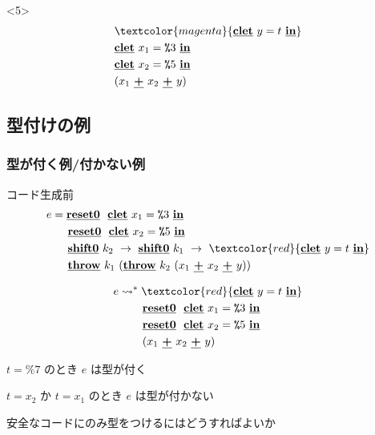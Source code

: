\documentclass[dvipdfmx,cjk,xcolor=dvipsnames,envcountsect,notheorems,12pt]{beamer}
\newcommand\cResetz{\underline{\textbf{reset0}}}
\newcommand\cShiftz{\underline{\textbf{shift0}}}
\newcommand\cThrow{\underline{\textbf{throw}}}
\newcommand\cPlus{\underline{\textbf{+}}}
\newcommand\cLet{\underline{\textbf{clet}}}
\newcommand\cIn{\underline{\textbf{in}}}
\newcommand\csp[1]{\texttt{\%}{#1}}
\newcommand\too{\leadsto^*}
\newcommand\red[1]{\textcolor{red}{#1}}
\newcommand\magenta[1]{\textcolor{magenta}{#1}}
\theoremstyle{definition}
\begin{document}
\begin{frame}
  \begin{onlyenv}<5>
    \begin{align*}
      & \magenta{\cLet~y=t~\cIn} \\
      & \cLet~x_1=\csp{3}~\cIn \\
      & \cLet~x_2=\csp{5}~\cIn \\
      & (x_1~\cPlus~x_2~\cPlus~y)
    \end{align*}
  \end{onlyenv}
\end{frame}

\subsection{型付けの例}

\begin{frame}
  \frametitle{型が付く例/付かない例}
  コード生成前
  \begin{align*}
    e & = \cResetz ~~\cLet~x_1=\csp{3}~\cIn \\
      & \phantom{=}~~ \cResetz ~~\cLet~x_2=\csp{5}~\cIn \\
      & \phantom{=}~~ \cShiftz~k_2~\to~ \cShiftz~k_1~\to~ \red{\cLet~y=t~\cIn} \\
      & \phantom{=}~~ \cThrow~k_1~(\cThrow~k_2~(x_1~\cPlus~x_2~\cPlus~y))
  \end{align*}

  \pause

  \begin{align*}
    e & \too \red{\cLet~y=t~\cIn} \\
      & \phantom{\too}~~ \cResetz ~~\cLet~x_1=\csp{3}~\cIn \\
      & \phantom{\too}~~ \cResetz ~~\cLet~x_2=\csp{5}~\cIn \\
      & \phantom{\too}~~ (x_1~\cPlus~x_2~\cPlus~y)
  \end{align*}

  \pause
  $t=\csp{7}$ のとき $e$ は型が付く

  $t=x_2$ か $t=x_1$ のとき $e$ は型が付かない
\end{frame}

\begin{frame}
  \center
  \huge{安全なコードにのみ型をつけるにはどうすればよいか}
\end{frame}
\end{document}
